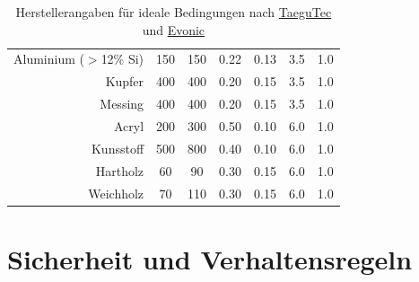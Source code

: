 \documentclass{\basedir/fablab-document}
\begin{document}
\begin{table}
\begin{tabular}{rcccccc}
	Aluminium	($>$12\% Si)			& 150	 	& 150  	& 0.22 	& 0.13	& 3.5 	& 1.0 	\\
	Kupfer											& 400	 	& 400  	& 0.20 	& 0.15	& 3.5 	& 1.0 	\\
	Messing											& 400	 	& 400  	& 0.20 	& 0.15	& 3.5 	& 1.0 	\\
	Acryl												& 200	 	& 300 	& 0.50 	& 0.10	& 6.0 	& 1.0 	\\
	Kunsstoff										& 500	 	& 800 	& 0.40 	& 0.10	& 6.0 	& 1.0 	\\
	Hartholz										& 60	 	& 90  	& 0.30 	& 0.15	& 6.0 	& 1.0 	\\
	Weichholz										& 70	 	& 110  	& 0.30 	& 0.15	& 6.0 	& 1.0 	\\
\end{tabular}
\caption{Herstellerangaben für ideale Bedingungen nach \href{http://www.taegutec.com/Ustyles/DownloadFiles/I_Grades_en.pdf}{TaeguTec} und \href{http://www.roehmschweiz.ch/fileadmin/Roehm/PDF_Plexiglas/311-1_Bearbeiten_von_PLEXIGLAS_de.pdf}{Evonic}}
\end{table}

\newpage
\section{Sicherheit und Verhaltensregeln}
\end{document}
